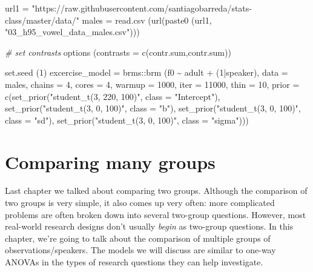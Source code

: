 \documentclass[
]{book}
\newenvironment{Shaded}{\begin{snugshade}}{\end{snugshade}}
\newcommand{\AttributeTok}[1]{\textcolor[rgb]{0.77,0.63,0.00}{#1}}
\newcommand{\CommentTok}[1]{\textcolor[rgb]{0.56,0.35,0.01}{\textit{#1}}}
\newcommand{\DecValTok}[1]{\textcolor[rgb]{0.00,0.00,0.81}{#1}}
\newcommand{\FunctionTok}[1]{\textcolor[rgb]{0.00,0.00,0.00}{#1}}
\newcommand{\NormalTok}[1]{#1}
\newcommand{\OtherTok}[1]{\textcolor[rgb]{0.56,0.35,0.01}{#1}}
\newcommand{\SpecialCharTok}[1]{\textcolor[rgb]{0.00,0.00,0.00}{#1}}
\newcommand{\StringTok}[1]{\textcolor[rgb]{0.31,0.60,0.02}{#1}}
\begin{document}
\begin{Shaded}
\begin{Highlighting}[]
\NormalTok{url1 }\OtherTok{=} \StringTok{"https://raw.githubusercontent.com/santiagobarreda/stats{-}class/master/data/"}
\NormalTok{males }\OtherTok{=} \FunctionTok{read.csv}\NormalTok{ (}\FunctionTok{url}\NormalTok{(}\FunctionTok{paste0}\NormalTok{ (url1, }\StringTok{"03\_h95\_vowel\_data\_males.csv"}\NormalTok{)))}

\CommentTok{\# set contrasts}
\FunctionTok{options}\NormalTok{ (}\AttributeTok{contrasts =} \FunctionTok{c}\NormalTok{(}\StringTok{\textquotesingle{}contr.sum\textquotesingle{}}\NormalTok{,}\StringTok{\textquotesingle{}contr.sum\textquotesingle{}}\NormalTok{))}

\FunctionTok{set.seed}\NormalTok{ (}\DecValTok{1}\NormalTok{)}
\NormalTok{excercise\_model }\OtherTok{=}  
\NormalTok{  brms}\SpecialCharTok{::}\FunctionTok{brm}\NormalTok{ (f0 }\SpecialCharTok{\textasciitilde{}}\NormalTok{ adult }\SpecialCharTok{+}\NormalTok{ (}\DecValTok{1}\SpecialCharTok{|}\NormalTok{speaker), }\AttributeTok{data =}\NormalTok{ males, }\AttributeTok{chains =} \DecValTok{4}\NormalTok{, }\AttributeTok{cores =} \DecValTok{4}\NormalTok{,}
       \AttributeTok{warmup =} \DecValTok{1000}\NormalTok{, }\AttributeTok{iter =} \DecValTok{11000}\NormalTok{, }\AttributeTok{thin =} \DecValTok{10}\NormalTok{,}
       \AttributeTok{prior =} \FunctionTok{c}\NormalTok{(}\FunctionTok{set\_prior}\NormalTok{(}\StringTok{"student\_t(3, 220, 100)"}\NormalTok{, }\AttributeTok{class =} \StringTok{"Intercept"}\NormalTok{),}
                 \FunctionTok{set\_prior}\NormalTok{(}\StringTok{"student\_t(3, 0, 100)"}\NormalTok{, }\AttributeTok{class =} \StringTok{"b"}\NormalTok{),}
                 \FunctionTok{set\_prior}\NormalTok{(}\StringTok{"student\_t(3, 0, 100)"}\NormalTok{, }\AttributeTok{class =} \StringTok{"sd"}\NormalTok{),}
                 \FunctionTok{set\_prior}\NormalTok{(}\StringTok{"student\_t(3, 0, 100)"}\NormalTok{, }\AttributeTok{class =} \StringTok{"sigma"}\NormalTok{)))}
\end{Highlighting}
\end{Shaded}

\hypertarget{comparing-many-groups}{%
\chapter{Comparing many groups}\label{comparing-many-groups}}

Last chapter we talked about comparing two groups. Although the comparison of two groups is very simple, it also comes up very often: more complicated problems are often broken down into several two-group questions. However, most real-world research designs don't usually \emph{begin} as two-group questions. In this chapter, we're going to talk about the comparison of multiple groups of observations/speakers. The models we will discuss are similar to one-way ANOVAs in the types of research questions they can help investigate.
\end{document}
